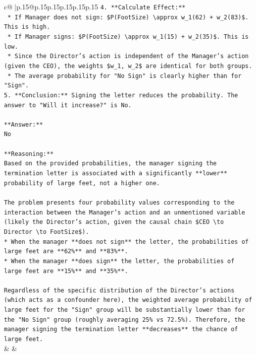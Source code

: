 \documentclass{article}
\begin{document}
{\begin{supertabular}{c@{$\;$}|p{.15\linewidth}@{}p{.15\linewidth}p{.15\linewidth}p{.15\linewidth}p{.15\linewidth}p{.15\linewidth}}
{{{\texttt{4.  **Calculate Effect:**} \\
\texttt{    *   If Manager does not sign: \$P(FootSize) \textbackslash{}approx w\_1(62) + w\_2(83)\$. This is high.} \\
\texttt{    *   If Manager signs: \$P(FootSize) \textbackslash{}approx w\_1(15) + w\_2(35)\$. This is low.} \\
\texttt{    *   Since the Director's action is independent of the Manager's action (given the CEO), the weights \$w\_1, w\_2\$ are identical for both groups.} \\
\texttt{    *   The average probability for "No Sign" is clearly higher than for "Sign".} \\
\texttt{5.  **Conclusion:** Signing the letter reduces the probability. The answer to "Will it increase?" is No.} \\
\\ 
\texttt{**Answer:**} \\
\texttt{No} \\
\\ 
\texttt{**Reasoning:**} \\
\texttt{Based on the provided probabilities, the manager signing the termination letter is associated with a significantly **lower** probability of large feet, not a higher one.} \\
\\ 
\texttt{The problem presents four probability values corresponding to the interaction between the Manager's action and an unmentioned variable (likely the Director's action, given the causal chain \$CEO \textbackslash{}to Director \textbackslash{}to FootSize\$).} \\
\texttt{*   When the manager **does not sign** the letter, the probabilities of large feet are **62\%** and **83\%**.} \\
\texttt{*   When the manager **does sign** the letter, the probabilities of large feet are **15\%** and **35\%**.} \\
\\ 
\texttt{Regardless of the specific distribution of the Director's actions (which acts as a confounder here), the weighted average probability of large feet for the "Sign" group will be substantially lower than for the "No Sign" group (roughly averaging 25\% vs 72.5\%). Therefore, the manager signing the termination letter **decreases** the chance of large feet.} \\
            }
        }
    }
    & & \\ \\


\end{supertabular}}
\end{document}
